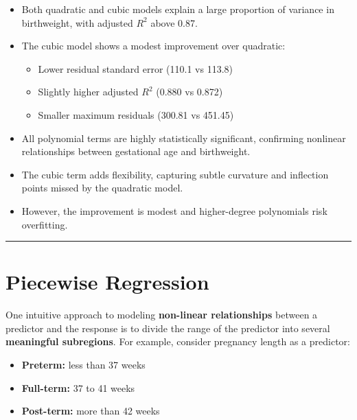 \documentclass[
  letterpaper,
  DIV=11,
  numbers=noendperiod]{scrreprt}
\providecommand{\tightlist}{%
  \setlength{\itemsep}{0pt}\setlength{\parskip}{0pt}}\usepackage{longtable,booktabs,array}
\begin{document}
\begin{itemize}
\item
  Both quadratic and cubic models explain a large proportion of variance
  in birthweight, with adjusted \(R^2\) above 0.87.
\item
  The cubic model shows a modest improvement over quadratic:

  \begin{itemize}
  \tightlist
  \item
    Lower residual standard error (110.1 vs 113.8)
  \item
    Slightly higher adjusted \(R^2\) (0.880 vs 0.872)
  \item
    Smaller maximum residuals (300.81 vs 451.45)
  \end{itemize}
\item
  All polynomial terms are highly statistically significant, confirming
  nonlinear relationships between gestational age and birthweight.
\item
  The cubic term adds flexibility, capturing subtle curvature and
  inflection points missed by the quadratic model.
\item
  However, the improvement is modest and higher-degree polynomials risk
  overfitting.
\end{itemize}

\begin{center}\rule{0.5\linewidth}{0.5pt}\end{center}

\hypertarget{piecewise-regression}{%
\section*{Piecewise Regression}\label{piecewise-regression}}


One intuitive approach to modeling \textbf{non-linear relationships}
between a predictor and the response is to divide the range of the
predictor into several \textbf{meaningful subregions}. For example,
consider pregnancy length as a predictor:

\begin{itemize}
\tightlist
\item
  \textbf{Preterm:} less than 37 weeks\\
\item
  \textbf{Full-term:} 37 to 41 weeks\\
\item
  \textbf{Post-term:} more than 42 weeks
\end{itemize}
\end{document}
